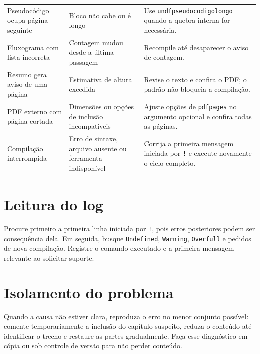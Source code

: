 \begin{longtable}{>{\raggedright\arraybackslash}p{} >{\raggedright\arraybackslash}p{} >{\raggedright\arraybackslash}p{}}
\addlinespace
Pseudocódigo ocupa página seguinte & Bloco não cabe ou é longo & Use \texttt{undfpseudocodigolongo} quando a quebra interna for necessária. \\
\addlinespace
Fluxograma com lista incorreta & Contagem mudou desde a última passagem & Recompile até desaparecer o aviso de contagem. \\
\addlinespace
Resumo gera aviso de uma página & Estimativa de altura excedida & Revise o texto e confira o PDF; o padrão não bloqueia a compilação. \\
\addlinespace
PDF externo com página cortada & Dimensões ou opções de inclusão incompatíveis & Ajuste opções de \texttt{pdfpages} no argumento opcional e confira todas as páginas. \\
\addlinespace
Compilação interrompida & Erro de sintaxe, arquivo ausente ou ferramenta indisponível & Corrija a primeira mensagem iniciada por \texttt{!} e execute novamente o ciclo completo. \\
\bottomrule
\end{longtable}

\section{Leitura do log}

Procure primeiro a primeira linha iniciada por \texttt{!}, pois erros posteriores podem ser consequência dela. Em seguida, busque \texttt{Undefined}, \texttt{Warning}, \texttt{Overfull} e pedidos de nova compilação. Registre o comando executado e a primeira mensagem relevante ao solicitar suporte.

\section{Isolamento do problema}

Quando a causa não estiver clara, reproduza o erro no menor conjunto possível: comente temporariamente a inclusão do capítulo suspeito, reduza o conteúdo até identificar o trecho e restaure as partes gradualmente. Faça esse diagnóstico em cópia ou sob controle de versão para não perder conteúdo.
